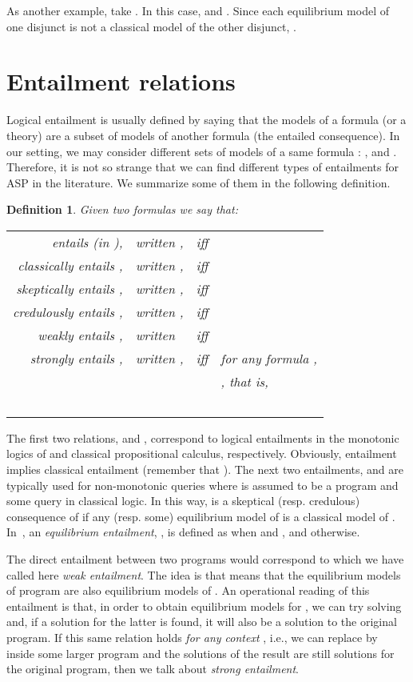 \documentclass{tlp}
\def\qed{~\hfill}
\newtheorem{definition}{Definition}
\begin{document}
As another example, take . In this case,  and . Since each equilibrium model of one disjunct is not a classical model of the other disjunct, .



\section{Entailment relations}\label{sec:entail}

Logical entailment is usually defined by saying that the models of a formula (or a theory) are a subset of models of another formula (the entailed consequence). In our setting, we may consider different sets of models of a same formula : ,  and . Therefore, it is not so strange that we can find different types of entailments for ASP in the literature. We summarize some of them in the following definition.

\begin{definition}
Given two formulas  we say that:

\begin{tabular}{rlcl}
 \emph{entails}  (in ), & written , & iff & \\
 \emph{classically entails} , & written , & iff & \\
 \emph{skeptically entails} , & written , & iff & \\
 \emph{credulously entails} , & written , & iff & \\
 \emph{weakly entails} , & written  & iff & \\
 \emph{strongly entails} , & written , & iff & for any formula , \\
& & & , that is,\\
& & &  \qed
\end{tabular}

\end{definition}

The first two relations,  and , correspond to logical entailments in the monotonic logics of  and classical propositional calculus, respectively. Obviously,  entailment implies classical entailment (remember that ). The next two entailments,  and  are typically used for non-monotonic queries where  is assumed to be a program and  some query in classical logic. In this way,  is a skeptical (resp. credulous) consequence of  if any (resp. some) equilibrium model of  is a classical model of . In~\cite{Pea06}, an  \emph{equilibrium entailment}, , is defined as  when  and , and  otherwise.


The direct entailment between two programs would correspond to  which we have called here \emph{weak entailment}. The idea is that  means that the equilibrium models of program  are also equilibrium models of . An operational reading of this entailment is that, in order to obtain equilibrium models for , we can try solving  and, if a solution for the latter is found, it will also be a solution to the original program. If this same relation holds \emph{for any context} , i.e., we can replace  by  inside some larger program and the solutions of the result are still solutions for the original program, then we talk about \emph{strong entailment}.
\end{document}
